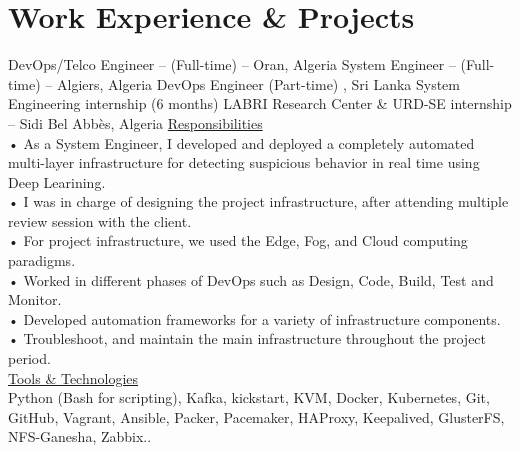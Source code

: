 \documentclass{cv}
\begin{document}
\section{Work Experience \& Projects}
{DevOps/Telco Engineer -- (Full-time)}
{\lab -- Oran, Algeria\vspace{.3cm}}
{}
{System Engineer -- (Full-time)}
{\umtk -- Algiers, Algeria\vspace{.3cm}}
{}
{DevOps Engineer (Part-time)}
{\keeneye, Sri Lanka}
{}
    {System Engineering internship (6 months)
    }
    {LABRI Research Center  \& URD-SE internship -- Sidi Bel Abbès, Algeria\vspace{.3cm}}
    {
      \underline {Responsibilities}\vspace{.3cm}\\
      • As a System Engineer, I developed and deployed a completely automated multi-layer infrastructure 
      for detecting suspicious behavior in real time using Deep Learining.\\
      • I was in charge of designing the project infrastructure, after attending multiple review session 
      with the client.\\
      • For project infrastructure, we used the Edge, Fog, and Cloud computing paradigms.\\
      • Worked in different phases of DevOps such as Design, Code, Build, Test and Monitor.\\
      • Developed automation frameworks for a variety of infrastructure components.\\
      • Troubleshoot, and maintain the main infrastructure throughout the project period.\\
      \underline {Tools \& Technologies}\\
      Python (Bash for scripting), Kafka, kickstart, KVM, Docker, Kubernetes, Git, GitHub, Vagrant, Ansible, Packer, Pacemaker, HAProxy, Keepalived, GlusterFS, NFS-Ganesha, Zabbix..\\
    }





\end{document}
